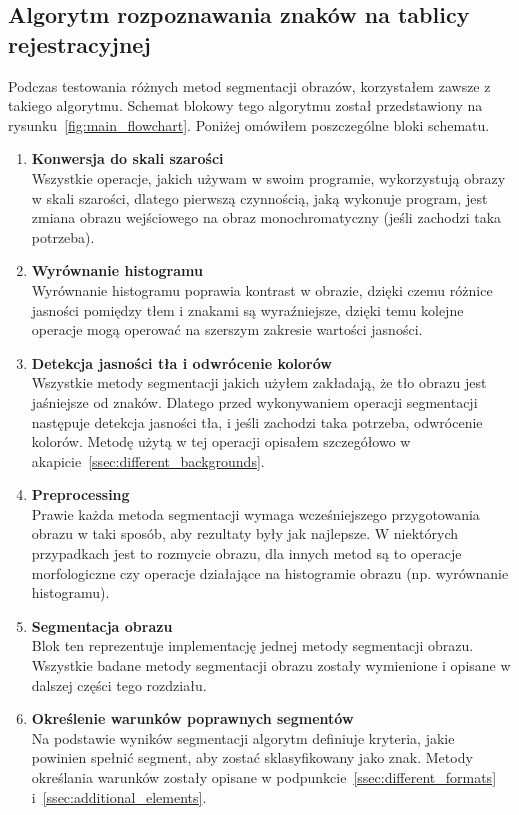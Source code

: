 \subsection{Algorytm rozpoznawania znaków na tablicy rejestracyjnej}
Podczas testowania różnych metod segmentacji obrazów, korzystałem zawsze z takiego algorytmu. Schemat blokowy tego algorytmu został przedstawiony na rysunku~\ref{fig:main_flowchart}. Poniżej omówiłem poszczególne bloki schematu.
\begin{enumerate}
  \item \textbf{Konwersja do skali szarości}\\
    Wszystkie operacje, jakich używam w swoim programie, wykorzystują obrazy w skali szarości, dlatego pierwszą czynnością, jaką wykonuje program, jest zmiana obrazu wejściowego na obraz monochromatyczny (jeśli zachodzi taka potrzeba).
  \item \textbf{Wyrównanie histogramu}\\
    Wyrównanie histogramu poprawia kontrast w obrazie, dzięki czemu różnice jasności pomiędzy tłem i znakami są wyraźniejsze, dzięki temu kolejne operacje mogą operować na szerszym zakresie wartości jasności.
  \item \textbf{Detekcja jasności tła i odwrócenie kolorów} \\
    Wszystkie metody segmentacji jakich użyłem zakładają, że tło obrazu jest jaśniejsze od znaków. Dlatego przed wykonywaniem operacji segmentacji następuje detekcja jasności tła, i jeśli zachodzi taka potrzeba, odwrócenie kolorów. Metodę użytą w tej operacji opisałem szczegółowo w akapicie~\ref{ssec:different_backgrounds}.
  \item \textbf{Preprocessing}\\
    Prawie każda metoda segmentacji wymaga wcześniejszego przygotowania obrazu w taki sposób, aby rezultaty były jak najlepsze. W niektórych przypadkach jest to rozmycie obrazu, dla innych metod są to operacje morfologiczne czy operacje działające na histogramie obrazu (np. wyrównanie histogramu).
  \item \textbf{Segmentacja obrazu}\\
    Blok ten reprezentuje implementację jednej metody segmentacji obrazu. Wszystkie badane metody segmentacji obrazu zostały wymienione i opisane w dalszej części tego rozdziału.
    \item \textbf{Określenie warunków poprawnych segmentów}\\
      Na podstawie wyników segmentacji algorytm definiuje kryteria, jakie powinien spełnić segment, aby zostać sklasyfikowany jako znak. Metody określania warunków zostały opisane w podpunkcie~\ref{ssec:different_formats} i~\ref{ssec:additional_elements}.

\end{enumerate}
